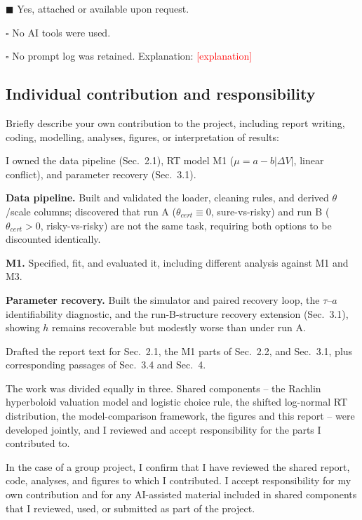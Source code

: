 \documentclass[11pt]{article}
\newcommand{\fillme}[1]{\textcolor{red}{[#1]}}
\begin{document}
\medskip

\noindent
$\blacksquare$ Yes, attached or available upon request.

\noindent
$\square$ No AI tools were used.

\noindent
$\square$ No prompt log was retained. Explanation:
\fillme{explanation}

\bigskip

\subsection*{Individual contribution and responsibility}

\noindent
Briefly describe your own contribution to the project, including report writing,
coding, modelling, analyses, figures, or interpretation of results:

\medskip

\noindent
I owned the data pipeline (Sec.~2.1), RT model M1 ($\mu = a - b|\Delta V|$, linear conflict), and parameter recovery (Sec.~3.1).

\textbf{Data pipeline.} Built and validated the loader, cleaning rules, and derived $\theta$/scale columns; discovered that run A ($\theta_{cert}\equiv0$, sure-vs-risky) and run B
($\theta_{cert}>0$, risky-vs-risky) are not the same task, requiring both options to be discounted identically.

\textbf{M1.} Specified, fit, and evaluated it, including different analysis against M1 and M3.

\textbf{Parameter recovery.} Built the simulator and paired recovery loop, the $\tau$--$a$
identifiability diagnostic, and the run-B-structure recovery extension (Sec.~3.1), showing $h$
remains recoverable but modestly worse than under run A.

Drafted the report text for Sec.~2.1, the M1 parts of Sec.~2.2, and Sec.~3.1, plus corresponding
passages of Sec.~3.4 and Sec.~4.


\medskip

\noindent
The work was divided equally in three. Shared components -- the Rachlin
hyperboloid valuation model and logistic choice rule, the shifted log-normal RT
distribution, the model-comparison framework, the figures and this report -- were
developed jointly, and I reviewed and accept responsibility for the parts I
contributed to.

\bigskip

\noindent
In the case of a group project, I confirm that I have reviewed the shared report,
code, analyses, and figures to which I contributed. I accept responsibility for my
own contribution and for any AI-assisted material included in shared components
that I reviewed, used, or submitted as part of the project.
\end{document}
